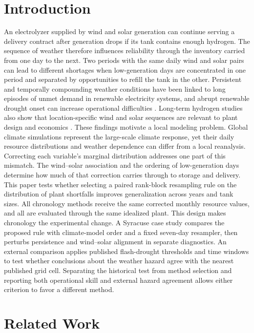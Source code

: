 \documentclass[10pt,a4paper,twocolumn]{article}
\begin{document}
\section{Introduction}
\label{sec:introduction}
An electrolyzer supplied by wind and solar generation can continue serving a delivery contract after generation drops if its tank contains enough hydrogen. The sequence of weather therefore influences reliability through the inventory carried from one day to the next. Two periods with the same daily wind and solar pairs can lead to different shortages when low-generation days are concentrated in one period and separated by opportunities to refill the tank in the other. Persistent and temporally compounding weather conditions have been linked to long episodes of unmet demand in renewable electricity systems, and abrupt renewable drought onset can increase operational difficulties \citep{vandermost2024,lin2026}. Long-term hydrogen studies also show that location-specific wind and solar sequences are relevant to plant design and economics \citep{wu2026}. These findings motivate a local modeling problem. Global climate simulations represent the large-scale climate response, yet their daily resource distributions and weather dependence can differ from a local reanalysis. Correcting each variable's marginal distribution addresses one part of this mismatch. The wind--solar association and the ordering of low-generation days determine how much of that correction carries through to storage and delivery. This paper tests whether selecting a paired rank-block resampling rule on the distribution of plant shortfalls improves generalization across years and tank sizes. All chronology methods receive the same corrected monthly resource values, and all are evaluated through the same idealized plant. This design makes chronology the experimental change. A Syracuse case study compares the proposed rule with climate-model order and a fixed seven-day resampler, then perturbs persistence and wind--solar alignment in separate diagnostics. An external comparison applies published flash-drought thresholds and time windows to test whether conclusions about the weather hazard agree with the nearest published grid cell. Separating the historical test from method selection and reporting both operational skill and external hazard agreement allows either criterion to favor a different method.

\section{Related Work}
\label{sec:related}
\end{document}

